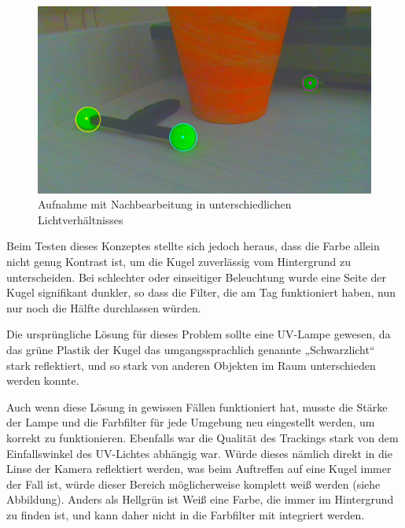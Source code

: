 \documentclass[12pt]{article}
\begin{document}
\begin{figure}
  \includegraphics[angle=0,width=\linewidth]{2d-color-dark.jpg}
  \caption{Aufnahme mit Nachbearbeitung in unterschiedlichen Lichtverhältnisses}
\end{figure}
Beim Testen dieses Konzeptes stellte sich jedoch heraus, dass die Farbe allein nicht genug Kontrast ist, um die Kugel zuverlässig vom Hintergrund zu unterscheiden. Bei schlechter oder einseitiger Beleuchtung wurde eine Seite der Kugel signifikant dunkler, so dass die Filter, die am Tag funktioniert haben, nun nur noch die Hälfte durchlassen würden.  

Die ursprüngliche Lösung für dieses Problem sollte eine UV-Lampe gewesen, da das grüne Plastik der Kugel das umgangssprachlich genannte „Schwarzlicht“ stark reflektiert, und so stark von anderen Objekten im Raum unterschieden werden konnte. 

Auch wenn diese Lösung in gewissen Fällen funktioniert hat, musste die Stärke der Lampe und die Farbfilter für jede Umgebung neu eingestellt werden, um korrekt zu funktionieren. Ebenfalls war die Qualität des Trackings stark von dem Einfallswinkel des UV-Lichtes abhängig war. Würde dieses nämlich direkt in die Linse der Kamera reflektiert werden, was beim Auftreffen auf eine Kugel immer der Fall ist, würde dieser Bereich möglicherweise komplett weiß werden (siehe Abbildung). Anders als Hellgrün ist Weiß eine Farbe, die immer im Hintergrund zu finden ist, und kann daher nicht in die Farbfilter mit integriert werden. 
\end{document}
